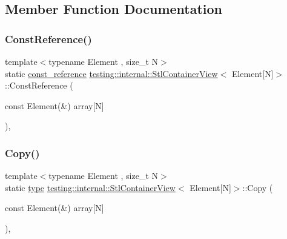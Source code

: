 \subsection{Member Function Documentation}
\mbox{\label{classtesting_1_1internal_1_1_stl_container_view_3_01_element[_n]_4_aa1b15d7f43d38751ae19f6dbdcb6aba3}} 
\subsubsection{\texorpdfstring{Const\+Reference()}{ConstReference()}}
{\footnotesize\ttfamily template$<$typename Element , size\+\_\+t N$>$ \\
static \hyperlink{classtesting_1_1internal_1_1_stl_container_view_3_01_element[_n]_4_a481e6ab99316939484fad9c561af5e28}{const\+\_\+reference} \hyperlink{classtesting_1_1internal_1_1_stl_container_view}{testing\+::internal\+::\+Stl\+Container\+View}$<$ Element\mbox{[}N\mbox{]}$>$\+::Const\+Reference (\begin{DoxyParamCaption}\item[{const Element(\&)}]{array\mbox{[}\+N\mbox{]} }\end{DoxyParamCaption})\hspace{0.3cm}{\ttfamily [inline]}, {\ttfamily [static]}}

\mbox{\label{classtesting_1_1internal_1_1_stl_container_view_3_01_element[_n]_4_af2cf79fbd7f829229a47b52f863c68f8}} 
\subsubsection{\texorpdfstring{Copy()}{Copy()}}
{\footnotesize\ttfamily template$<$typename Element , size\+\_\+t N$>$ \\
static \hyperlink{classtesting_1_1internal_1_1_stl_container_view_3_01_element[_n]_4_a364efca99cc5a02829b4e3413c506b09}{type} \hyperlink{classtesting_1_1internal_1_1_stl_container_view}{testing\+::internal\+::\+Stl\+Container\+View}$<$ Element\mbox{[}N\mbox{]}$>$\+::Copy (\begin{DoxyParamCaption}\item[{const Element(\&)}]{array\mbox{[}\+N\mbox{]} }\end{DoxyParamCaption})\hspace{0.3cm}{\ttfamily [inline]}, {\ttfamily [static]}}

